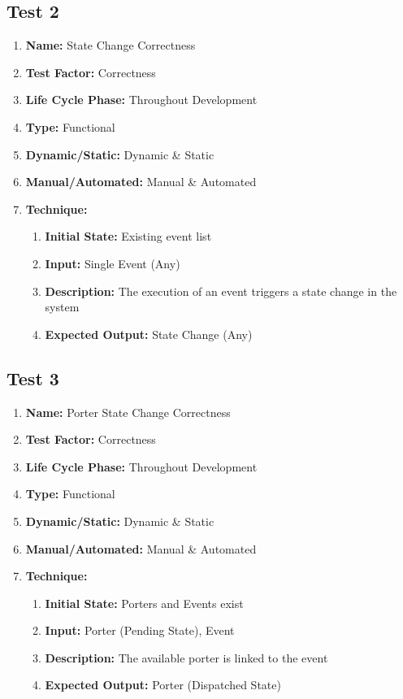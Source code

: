 \documentclass[paper=letter, fontsize=10pt]{scrartcl}
\numberwithin{equation}{section}		%
\numberwithin{figure}{section}			%
\numberwithin{table}{section}				%
\begin{document}
\subsection{Test 2}
\begin{enumerate}[a]
	\item \textbf{Name:} State Change Correctness
	\item \textbf{Test Factor:} Correctness
	\item \textbf{Life Cycle Phase:} Throughout Development
	\item \textbf{Type:} Functional
	\item \textbf{Dynamic/Static:} Dynamic \& Static
	\item \textbf{Manual/Automated:} Manual \& Automated
	\item \textbf{Technique:}
		\begin{enumerate}[i]
			\item \textbf{Initial State:} Existing event list
			\item \textbf{Input:} Single Event (Any)
			\item \textbf{Description:} The execution of an event triggers a state change in the system
			\item \textbf{Expected Output:} State Change (Any)
		\end{enumerate}
\end{enumerate}

\subsection{Test 3}
\begin{enumerate}[a]
	\item \textbf{Name:} Porter State Change Correctness 	
	\item \textbf{Test Factor:} Correctness 
	\item \textbf{Life Cycle Phase:} Throughout Development
	\item \textbf{Type:} Functional
	\item \textbf{Dynamic/Static:} Dynamic \& Static
	\item \textbf{Manual/Automated:} Manual \& Automated
	\item \textbf{Technique:}
		\begin{enumerate}[i]
			\item \textbf{Initial State:} Porters and Events exist
			\item \textbf{Input:} Porter (Pending State), Event
			\item \textbf{Description:} The available porter is linked to the event
			\item \textbf{Expected Output:} Porter (Dispatched State)
		\end{enumerate}
\end{enumerate}
\end{document}
